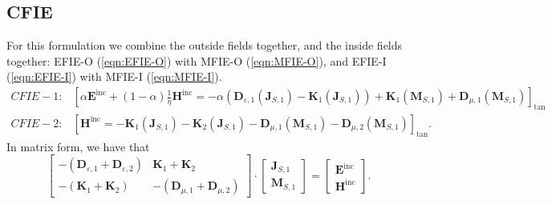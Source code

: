 \documentclass[a4paper,10pt]{book}
\newcommand{\field}[1]{\mathbf{#1}}
\newcommand{\current}[1]{\mathbf{#1}}
\newcommand{\operator}[1]{\mathbf{#1}}
\begin{document}
\subsection{CFIE}
%
\par
For this formulation we combine the outside fields together, and the inside fields together: EFIE-O (\ref{eqn:EFIE-O}) with MFIE-O (\ref{eqn:MFIE-O}), and EFIE-I (\ref{eqn:EFIE-I}) with MFIE-I (\ref{eqn:MFIE-I}).
\begin{eqnarray}
CFIE-1: & \boxed{
\left[\alpha \field{E}^\text{inc} + \left(1-\alpha \right) \frac{1}{\eta}\field{H}^\text{inc} =  - \alpha \left(\operator{D}_{\varepsilon, 1}\left(\current{J}_{S,1}\right) - \operator{K}_{1}\left(\current{J}_{S,1}\right) \right) + \operator{K}_{1}\left(\current{M}_{S,1}\right) + \operator{D}_{\mu, 1}\left(\current{M}_{S,1}\right) \right]_\text{tan} } \\
CFIE-2: & \boxed{
\left[\field{H}^\text{inc} = - \operator{K}_{1}\left(\current{J}_{S,1}\right) - \operator{K}_{2}\left(\current{J}_{S,1}\right) - \operator{D}_{\mu, 1}\left(\current{M}_{S,1}\right) - \operator{D}_{\mu, 2}\left(\current{M}_{S,1}\right)  \right]_\text{tan} }.
\end{eqnarray}
In matrix form, we have that
\begin{equation}
\left[
\begin{matrix}
  - \left(\operator{D}_{\varepsilon, 1} + \operator{D}_{\varepsilon, 2} \right) & \operator{K}_{1} + \operator{K}_{2} \\
  -\left(\operator{K}_{1} + \operator{K}_{2} \right) & - \left(\operator{D}_{\mu, 1} + \operator{D}_{\mu, 2}\right)
\end{matrix}
\right]
\cdot 
\left[
\begin{matrix}
  \current{J}_{S,1} \\
  \current{M}_{S,1}  
\end{matrix}
\right]
=
\left[
\begin{matrix}
  \field{E}^\text{inc} \\
  \field{H}^\text{inc}
\end{matrix}
\right].
\end{equation}


\end{document}
